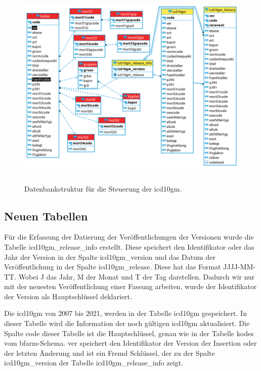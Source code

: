 \clearpage	
\begin{figure}[ht]
	\centering
	\includegraphics[height=10cm]{figures/icdSqlSchema}
	\caption[Datenbankstruktur]{Datenbankstruktur für die Steuerung der \ac{icd10gm}.}
	\label{fig:reldb2}
\end{figure}

\subsection{Neuen Tabellen} \label{newtables}

Für die Erfassung der Datierung der Veröffentlichungen der Versionen wurde die Tabelle \textsf{icd10gm\_release\_info} erstellt. Diese speichert den Identifikator oder das Jahr der Version in der Spalte \textsf{icd10gm\_version} und das Datum der Veröffentlichung in der Spalte \textsf{icd10gm\_release}. Diese hat das Format \textsf{JJJJ-MM-TT}. Wobei J das Jahr, M der Monat und T der Tag darstellen. Dadurch wir nur mit der neuesten Veröffentlichung einer Fassung arbeiten, wurde der Identifikator der Version als Hauptschlüssel deklariert.


Die \ac{icd10gm} von 2007 bis 2021, werden in der Tabelle \textsf{icd10gm} gespeichert. In dieser Tabelle wird die Information der noch gültigen \ac{icd10gm} aktualisiert. Die Spalte \textsf{code} dieser Tabelle ist die Hauptschlüssel, genau wie in der Tabelle \textsf{kodes} vom \ac{bfarm}-Schema. \textsf{ver} speichert den Identifikator der Version der Insertion oder der letzten Änderung und ist ein Fremd Schlüssel, der zu der Spalte \textsf{icd10gm\_version} der Tabelle \textsf{icd10gm\_release\_info} zeigt.

